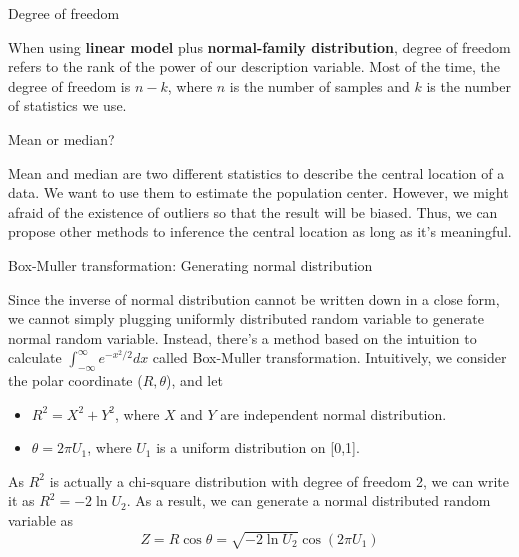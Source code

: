 \documentclass[../Transformation.tex]{subfiles}
\begin{document}
\begin{remark}{Degree of freedom}
	
When using {\bf linear model} plus {\bf normal-family distribution}, degree of freedom refers to the rank of the power of our description variable. Most of the time, the degree of freedom is $n-k$, where $n$ is the number of samples and $k$ is the number of statistics we use. 
\end{remark}


\begin{remark}{Mean or median?}
	
Mean and median are two different statistics to describe the central location of a data. We want to use them to estimate the population center. However, we might afraid of the existence of outliers so that the result will be biased. Thus, we can propose other methods to inference the central location as long as it's meaningful.
\end{remark}

\begin{remark}{Box-Muller transformation: Generating normal distribution}
	
Since the inverse of normal distribution cannot be written down in a close form, we cannot simply plugging uniformly distributed random variable to generate normal random variable. Instead, there's a method based on the intuition to calculate $\int_{-\infty}^{\infty} e^{-x^2/2}dx$ called Box-Muller transformation. Intuitively, we consider the polar coordinate ($R,\theta$), and let
\begin{itemize}
	\item $R^2 = X^2+Y^2$, where $X$ and $Y$ are independent normal distribution.
	\item $\theta = 2\pi U_1$, where $U_1$ is a uniform distribution on [0,1].
\end{itemize}
As $R^2$ is actually a chi-square distribution with degree of freedom 2, we can write it as $R^2=-2\ln U_2$. As a result, we can generate a normal distributed random variable as
$$Z = R\cos\theta = \sqrt{-2\ln U_2}\cos(2\pi U_1)$$
\end{remark}
\end{document}
